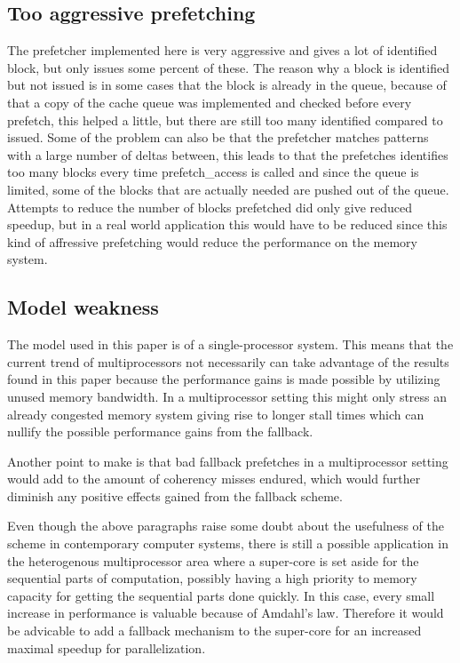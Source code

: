 \documentclass[12pt,journal,compsoc]{IEEEtran}
\begin{document}
\subsection{Too aggressive prefetching}
The prefetcher implemented here is very aggressive and gives a lot of identified block, but only issues some percent of these. The reason why a block is identified but not issued is in some cases that the block is already in the queue, because of that a copy of the cache queue was implemented and checked before every prefetch, this helped a little, but there are still too many identified compared to issued. Some of the problem can also be that the prefetcher matches patterns with a large number of deltas between, this leads to that the prefetches identifies too many blocks every time prefetch\_access is called and since the queue is limited, some of the blocks that are actually needed are pushed out of the queue. Attempts to reduce the number of blocks prefetched did only give reduced speedup, but in a real world application this would have to be reduced since this kind of affressive prefetching would reduce the performance on the memory system.

\subsection{Model weakness}
The model used in this paper is of a single-processor system.
This means that the current trend of multiprocessors not
necessarily can take advantage of the results found in
this paper because the performance gains is made possible
by utilizing unused memory bandwidth. In a multiprocessor
setting this might only stress an already congested memory
system giving rise to longer stall times which can nullify
the possible performance gains from the fallback.

Another point to make is that bad fallback prefetches in a
multiprocessor setting would add to the amount of coherency
misses endured, which would further diminish any positive
effects gained from the fallback scheme.

Even though the above paragraphs raise some doubt about
the usefulness of the scheme in contemporary computer systems,
there is still a possible application in the heterogenous
multiprocessor area where a super-core is set aside for the
sequential parts of computation, possibly having a high priority
to memory capacity for getting the sequential parts done quickly.
In this case, every small increase in performance is valuable
because of Amdahl's law. Therefore it would be advicable to add
a fallback mechanism to the super-core for an increased maximal
speedup for parallelization.
\end{document}
